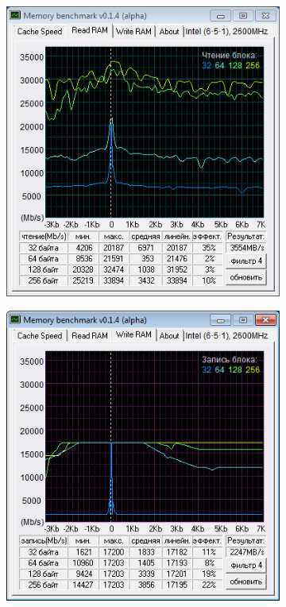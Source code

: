 \documentclass[
	a4paper,
	oneside,
	BCOR = 10mm,
	DIV = 12,
	12pt,
	headings = normal,
]{scrartcl}
\begin{document}
\begin{figure}[!htbp]
\begin{subfigure}[t]{\columnwidth / 3}
					\includegraphics[width = \columnwidth]{./assets/y03s02-pcdiag-lab-02-p02-02.png}
					\caption{}
					\label{subfig:membench-test-02}
				\end{subfigure}%
				\begin{subfigure}[t]{\columnwidth / 3}
					\centering
					\includegraphics[width = \columnwidth]{./assets/y03s02-pcdiag-lab-02-p02-03.png}

\end{subfigure}
\end{figure}
\end{document}
